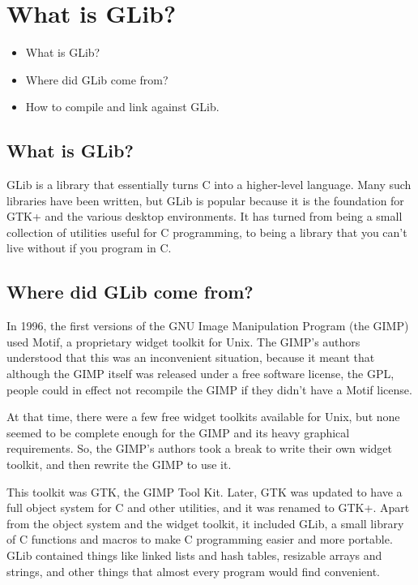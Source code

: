 \chapter{What is GLib?}

\begin{itemize}
\item What is GLib?
\item Where did GLib come from?
\item How to compile and link against GLib.
\end{itemize}

\section{What is GLib?}

GLib is a library that essentially turns C into a higher-level
language.  Many such libraries have been written, but GLib is popular
because it is the foundation for GTK+ and the various desktop
environments.  It has turned from being a small collection of
utilities useful for C programming, to being a library that you can't
live without if you program in C.

\section{Where did GLib come from?}

In 1996, the first versions of the GNU Image Manipulation Program (the
GIMP) used Motif, a proprietary widget toolkit for Unix.  The GIMP's
authors understood that this was an inconvenient situation, because it
meant that although the GIMP itself was released under a free software
license, the GPL, people could in effect not recompile the GIMP if
they didn't have a Motif license.

At that time, there were a few free widget toolkits available for
Unix, but none seemed to be complete enough for the GIMP and its heavy
graphical requirements.  So, the GIMP's authors took a break to write
their own widget toolkit, and then rewrite the GIMP to use it.

This toolkit was GTK, the GIMP Tool Kit.  Later, GTK was updated to
have a full object system for C and other utilities, and it was
renamed to GTK+.  Apart from the object system and the widget toolkit,
it included GLib, a small library of C functions and macros to make
C programming easier and more portable.  GLib contained things like
linked lists and hash tables, resizable arrays and strings, and other
things that almost every program would find convenient.

